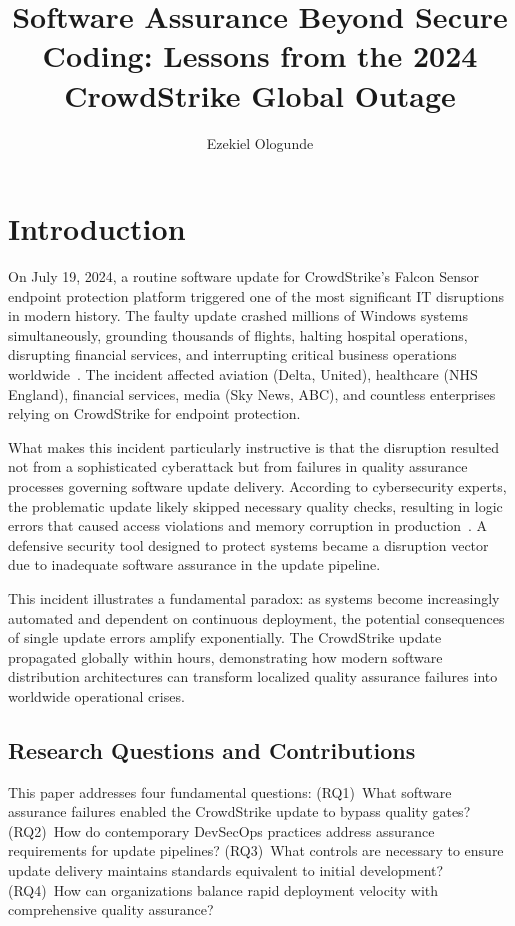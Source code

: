 \documentclass[sigconf,nonacm]{acmart}
\title{Software Assurance Beyond Secure Coding: Lessons from the 2024 CrowdStrike Global Outage}
\author{Ezekiel Ologunde}
\affiliation{\institution{Independent Researcher}\city{Boston}\state{MA}\country{USA}}
\begin{document}
\maketitle

\section{Introduction}

On July 19, 2024, a routine software update for CrowdStrike's Falcon Sensor endpoint
protection platform triggered one of the most significant IT disruptions in modern history.
The faulty update crashed millions of Windows systems simultaneously, grounding thousands
of flights, halting hospital operations, disrupting financial services, and interrupting
critical business operations worldwide~\cite{plummer2024crowdstrike}. The incident affected
aviation (Delta, United), healthcare (NHS England), financial services, media (Sky News,
ABC), and countless enterprises relying on CrowdStrike for endpoint protection.

What makes this incident particularly instructive is that the disruption resulted not from
a sophisticated cyberattack but from failures in quality assurance processes governing
software update delivery. According to cybersecurity experts, the problematic update likely
skipped necessary quality checks, resulting in logic errors that caused access violations
and memory corruption in production~\cite{siddiqui2024crowdstrike}. A defensive security
tool designed to protect systems became a disruption vector due to inadequate software
assurance in the update pipeline.

This incident illustrates a fundamental paradox: as systems become increasingly automated
and dependent on continuous deployment, the potential consequences of single update errors
amplify exponentially. The CrowdStrike update propagated globally within hours,
demonstrating how modern software distribution architectures can transform localized quality
assurance failures into worldwide operational crises.

\subsection{Research Questions and Contributions}
\sloppy

This paper addresses four fundamental questions: (RQ1)~What software assurance failures
enabled the CrowdStrike update to bypass quality gates? (RQ2)~How do contemporary
DevSecOps practices address assurance requirements for update pipelines? (RQ3)~What
controls are necessary to ensure update delivery maintains standards equivalent to initial
development? (RQ4)~How can organizations balance rapid deployment velocity with
comprehensive quality assurance?
\end{document}
